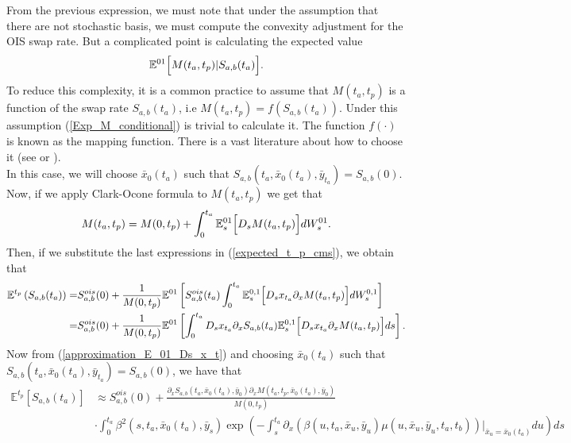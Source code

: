 \documentclass[a4paper,10pt]{article}
\newcommand{\1}{\mathbf{1}}
\begin{document}
From the previous expression, we must note that under the assumption that there are not stochastic basis, we must compute the convexity adjustment for the OIS swap rate. But a complicated point is calculating the expected value 
\begin{equation}\label{Exp_M_conditional}
\mathbb{E}^{01}\Bigl[ M(t_a,t_p)|S_{a,b}(t_a)\Bigr].
\end{equation}
To reduce this complexity, it is a common practice to assume that $M(t_a,t_p)$ is a function of the swap rate $S_{a,b}(t_a)$, i.e   $M(t_a,t_p)=f(S_{a,b}(t_a))$. Under this assumption (\ref{Exp_M_conditional}) is trivial to calculate it. The function $f(\cdot)$ is known as the mapping function. There is a vast literature about how to choose it (see \cite{AndreasenPiterbargIII} or \cite{Hagan20}). \\ 
In this case, we will choose $\bar{x}_0(t_a)$ such that $S_{a,b}(t_a,\bar{x}_0(t_a),\bar{y}_{t_a})=S_{a,b}(0)$. Now, if we apply Clark-Ocone formula to $M(t_a,t_p)$ we get that
\begin{equation} \label{clark_ocone_swap_m}
M(t_a,t_p) = M(0,t_p)+ \int_{0}^{t_a} \mathbb{E}_s^{01}\Bigl[D_s M(t_a,t_p)\Bigr] dW^{01}_s.
\end{equation}
Then, if we substitute the last expressions in (\ref{expected_t_p_cms}), we obtain that
\begin{align}\label{cms_first_order_convexity_prev}
\mathbb{E}^{t_p}\left(S_{a,b}(t_a)\right) =& S^{ois}_{a,b}(0) + \frac{1}{M(0,t_p)} \mathbb{E}^{01}\left[ S^{ois}_{a,b}(t_a) \int_{0}^{t_a} \mathbb{E}^{0,1}_s\Bigl[D_s x_{t_a}\partial_x M(t_a,t_p)  \Bigr] dW^{0,1}_s   \right] \nonumber \\
=&  S^{ois}_{a,b}(0) + \frac{1}{M(0,t_p)} \mathbb{E}^{01}\left[\int_{0}^{t_a} D_s x_{t_a} \partial_x S_{a,b}(t_a) \mathbb{E}^{0,1}_s\Bigl[D_s x_{t_a}\partial_x M(t_a,t_p)  \Bigr] ds   \right].
\end{align}
Now from (\ref{approximation_E_01_Ds_x_t}) and choosing $\bar{x}_0(t_a)$ such that $S_{a,b}(t_a,\bar{x}_0(t_a),\bar{y}_{t_a})=S_{a,b}(0)$, we have that
\begin{align}
\mathbb{E}^{t_p}\left[S_{a,b}(t_a)\right] &\approx  S^{ois}_{a,b}(0) + \frac{\partial_x S_{a,b}(t_a,\bar{x}_0(t_a), \bar{y}_0) \partial_x M(t_a,t_p,\bar{x}_0(t_a), \bar{y}_0)} {M(0,t_p)}\nonumber \\
&\cdot \int_{0}^{t_a}  \beta^2(s,t_a,\bar{x}_0(t_a),\bar{y}_s)\exp\left(-\int_{s}^{t_a}\partial_x (\beta(u,t_a,\bar{x}_u,\bar{y}_u) \mu(u,\bar{x}_u, \bar{y}_u,t_a,t_b))|_{\bar{x}_u=\bar{x}_{0}(t_a)}  du \right)ds 
\end{align}





%
\end{document}
